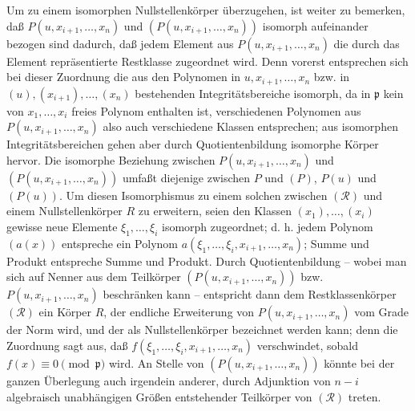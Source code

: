\documentclass[11pt]{article}
\providecommand{\frakp}{\mathfrak p}
\begin{document}
Um zu einem isomorphen Nullstellenkörper überzugehen, ist weiter zu bemerken, daß $P(u,x_{i+1},\ldots,x_n)$ und $(P(u,x_{i+1},\ldots,x_n))$ isomorph aufeinander bezogen sind dadurch, daß jedem Element aus $P(u,x_{i+1},\ldots,x_n)$ die durch das Element repräsentierte Restklasse zugeordnet wird. Denn vorerst entsprechen sich bei dieser Zuordnung die aus den Polynomen in $u,x_{i+1},\ldots,x_n$ bzw. in $(u),(x_{i+1}),\ldots,(x_n)$ bestehenden Integritätsbereiche isomorph, da in $\frakp$ kein von $x_1,\ldots,x_i$ freies Polynom enthalten ist, verschiedenen Polynomen aus $P(u,x_{i+1},\ldots,x_n)$ also auch verschiedene Klassen entsprechen; aus isomorphen Integritätsbereichen gehen aber durch Quotientenbildung isomorphe Körper hervor. Die isomorphe Beziehung zwischen $P(u,x_{i+1},\ldots,x_n)$ und $(P(u,x_{i+1},\ldots,x_n))$ umfaßt diejenige zwischen $P$ und $(P)$, $P(u)$ und $(P(u))$. Um diesen Isomorphismus zu einem solchen zwischen $(\mathcal R)$ und einem Nullstellenkörper $R$ zu erweitern, seien den Klassen $(x_1),\ldots,(x_i)$ gewisse neue Elemente $\xi_1,\ldots,\xi_i$ isomorph zugeordnet; d. h. jedem Polynom $(a(x))$ entspreche ein Polynom $a(\xi_1,\ldots,\xi_i,x_{i+1},\ldots,x_n)$; Summe und Produkt entspreche Summe und Produkt. Durch Quotientenbildung -- wobei man sich auf Nenner aus dem Teilkörper $(P(u,x_{i+1},\ldots,x_n))$ bzw. $P(u,x_{i+1},\ldots,x_n)$ beschränken kann -- entspricht dann dem Restklassenkörper $(\mathcal R)$ ein Körper $R$, der endliche Erweiterung von $P(u,x_{i+1},\ldots,x_n)$ vom Grade der Norm wird, und der als Nullstellenkörper bezeichnet werden kann; denn die Zuordnung sagt aus, daß $f(\xi_1,\ldots,\xi_i,x_{i+1},\ldots,x_n)$ verschwindet, sobald $f(x)\equiv0\pmod{\frakp}$ wird. An Stelle von $(P(u,x_{i+1},\ldots,x_n))$ könnte bei der ganzen Überlegung auch irgendein anderer, durch Adjunktion von $n-i$ algebraisch unabhängigen Größen entstehender Teilkörper von $(\mathcal R)$ treten.
\end{document}

